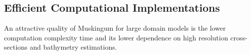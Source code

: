 \subsection{Efficient Computational Implementations}
\label{subsec:efficient-computational-implementations}

An attractive quality of Muskingum for large domain models is the lower computation complexity time and its lower dependence on high resolution
cross-sections and bathymetry estimations.

